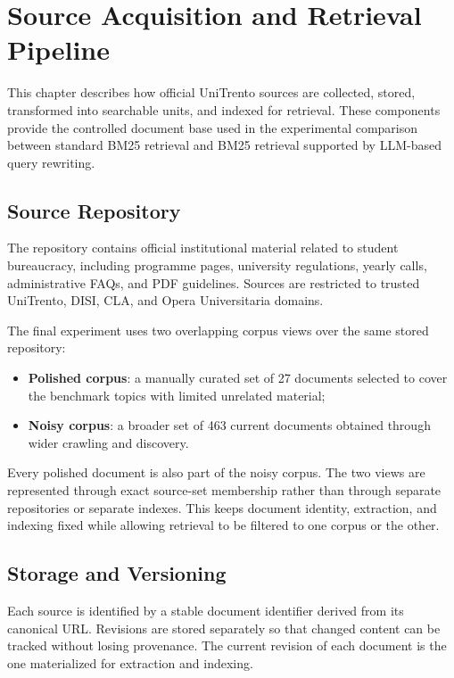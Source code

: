 \chapter{Source Acquisition and Retrieval Pipeline}

This chapter describes how official UniTrento sources are collected, stored, transformed into searchable units, and indexed for retrieval. These components provide the controlled document base used in the experimental comparison between standard BM25 retrieval and BM25 retrieval supported by LLM-based query rewriting.

\section{Source Repository}
The repository contains official institutional material related to student bureaucracy, including programme pages, university regulations, yearly calls, administrative FAQs, and PDF guidelines. Sources are restricted to trusted UniTrento, DISI, CLA, and Opera Universitaria domains.

The final experiment uses two overlapping corpus views over the same stored repository:

\begin{itemize}
    \item \textbf{Polished corpus}: a manually curated set of 27 documents selected to cover the benchmark topics with limited unrelated material;
    \item \textbf{Noisy corpus}: a broader set of 463 current documents obtained through wider crawling and discovery.
\end{itemize}

Every polished document is also part of the noisy corpus. The two views are represented through exact source-set membership rather than through separate repositories or separate indexes. This keeps document identity, extraction, and indexing fixed while allowing retrieval to be filtered to one corpus or the other.

\section{Storage and Versioning}
Each source is identified by a stable document identifier derived from its canonical URL. Revisions are stored separately so that changed content can be tracked without losing provenance. The current revision of each document is the one materialized for extraction and indexing.

